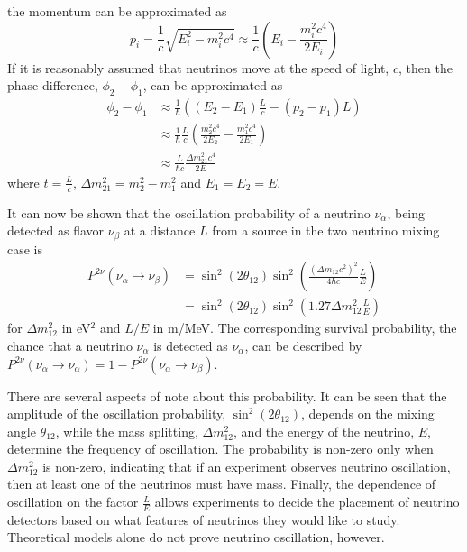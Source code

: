 the momentum can be approximated as
\begin{equation}
	p_i = \frac{1}{c}\sqrt{E^2_i-m^2_ic^4 } \approx \frac{1}{c}\left(E_i - \frac{m^2_ic^4}{2E_i} \right)
\end{equation}
If it is reasonably assumed that neutrinos move at the speed of light, $c$, then
the phase difference, $\phi_2 - \phi_1$, can be approximated as
\begin{equation}
\begin{split}
	\phi_2 - \phi_1 &\approx \frac{1}{\hbar}\left( (E_2 - E_1)\frac{L}{c} - (p_2 - p_1)L  \right)\\
	&\approx \frac{1}{\hbar}\frac{L}{c}\left(\frac{m_2^2c^4}{2E_2} - \frac{m_1^2c^4}{2E_1}\right) \\
	&\approx \frac{L}{\hbar c}\frac{\Delta m^2_{21}c^4}{2E}
\end{split}
\end{equation}
where $t = \frac{L}{c}$, $\Delta m^2_{21} = m_2^2 - m_1^2$ and $E_1 = E_2 = E$.

It can now be shown that the oscillation probability of a neutrino $\nu_\alpha$, being detected as flavor $\nu_\beta$ at a distance $L$ from a source in the two neutrino mixing case is
\begin{equation} \label{eq:oscprob}
\begin{split}
	P^{2\nu}(\nu_\alpha \rightarrow \nu_\beta) &= \sin^2\left(2\theta_{12}\right)\sin^2\left(\frac{(\Delta m_{12}c^2)^2}{4\hbar c}\frac{L}{E}\right) \\
	&= \sin^2\left(2\theta_{12}\right)\sin^2\left(1.27\Delta m^2_{12}\frac{L}{E} \right)
\end{split}
\end{equation}
for $\Delta m^2_{12}$ in eV$^2$ and $L/E$ in m/MeV.
The corresponding survival probability, the chance that a neutrino $\nu_\alpha$ is detected as $\nu_\alpha$, can be described by $P^{2\nu}(\nu_\alpha \rightarrow \nu_\alpha) = 1 - P^{2\nu}(\nu_\alpha \rightarrow \nu_\beta)$.

There are several aspects of note about this probability. It can be seen that the amplitude of the oscillation probability, $\sin^2\left(2\theta_{12}\right)$, depends on the mixing angle $\theta_{12}$, while the mass splitting, $\Delta m^2_{12}$, and the energy of the neutrino, $E$,  determine the frequency of oscillation. 
The probability is non-zero only when $\Delta m^2_{12}$ is non-zero, indicating that if an experiment observes neutrino oscillation, then at least one of the neutrinos must have mass.
Finally, the dependence of oscillation on the factor $\frac{L}{E}$ allows experiments to decide the placement of neutrino detectors based on what features of neutrinos they would like to study. 
Theoretical models alone do not prove neutrino oscillation, however.

